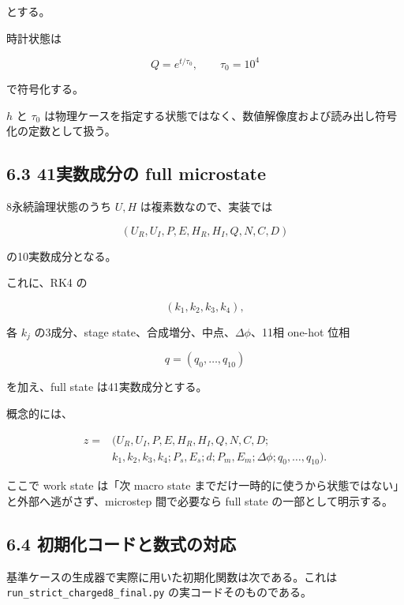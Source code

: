 \documentclass[
  a4paper,
]{ltjsarticle}
\begin{document}
とする。

時計状態は

\[
Q=e^{t/\tau_0},
\qquad
\tau_0=10^4
\]

で符号化する。

\(h\) と \(\tau_0\)
は物理ケースを指定する状態ではなく、数値解像度および読み出し符号化の定数として扱う。

\subsection{6.3 41実数成分の full
microstate}\label{ux5b9fux6570ux6210ux5206ux306e-full-microstate}

8永続論理状態のうち \(U,H\) は複素数なので、実装では

\[
(U_R,U_I,P,E,H_R,H_I,Q,N,C,D)
\]

の10実数成分となる。

これに、RK4 の

\[
(k_1,k_2,k_3,k_4),
\]

各 \(k_j\) の3成分、stage state、合成増分、中点、\(\Delta\phi\)、11相
one-hot 位相

\[
q=(q_0,\ldots,q_{10})
\]

を加え、full state は41実数成分とする。

概念的には、

\[
\begin{aligned}
z=&(U_R,U_I,P,E,H_R,H_I,Q,N,C,D;\\
&k_1,k_2,k_3,k_4;P_s,E_s;d;P_m,E_m;\Delta\phi;q_0,\ldots,q_{10}).
\end{aligned}
\]

ここで work state は「次 macro state
までだけ一時的に使うから状態ではない」と外部へ逃がさず、microstep
間で必要なら full state の一部として明示する。

\subsection{6.4
初期化コードと数式の対応}\label{ux521dux671fux5316ux30b3ux30fcux30c9ux3068ux6570ux5f0fux306eux5bfeux5fdc}

基準ケースの生成器で実際に用いた初期化関数は次である。これは
\texttt{run\_strict\_charged8\_final.py} の実コードそのものである。
\end{document}
